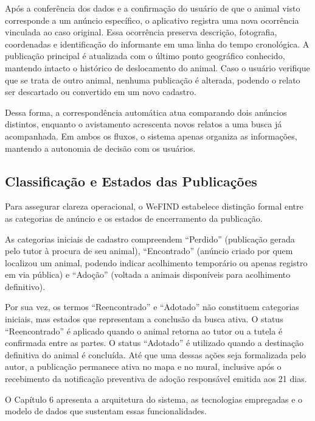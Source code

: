 Após a conferência dos dados e a confirmação do usuário de que o animal visto corresponde a um anúncio específico, o aplicativo registra uma nova ocorrência vinculada ao caso original. Essa ocorrência preserva descrição, fotografia, coordenadas e identificação do informante em uma linha do tempo cronológica. A publicação principal é atualizada com o último ponto geográfico conhecido, mantendo intacto o histórico de deslocamento do animal. Caso o usuário verifique que se trata de outro animal, nenhuma publicação é alterada, podendo o relato ser descartado ou convertido em um novo cadastro.

Dessa forma, a correspondência automática atua comparando dois anúncios distintos, enquanto o avistamento acrescenta novos relatos a uma busca já acompanhada. Em ambos os fluxos, o sistema apenas organiza as informações, mantendo a autonomia de decisão com os usuários.


\subsection{Classificação e Estados das Publicações}

Para assegurar clareza operacional, o WeFIND estabelece distinção formal entre as categorias de anúncio e os estados de encerramento da publicação.

As categorias iniciais de cadastro compreendem ``Perdido'' (publicação gerada pelo tutor à procura de seu animal), ``Encontrado'' (anúncio criado por quem localizou um animal, podendo indicar acolhimento temporário ou apenas registro em via pública) e ``Adoção'' (voltada a animais disponíveis para acolhimento definitivo).

Por sua vez, os termos ``Reencontrado'' e ``Adotado'' não constituem categorias iniciais, mas estados que representam a conclusão da busca ativa. O status ``Reencontrado'' é aplicado quando o animal retorna ao tutor ou a tutela é confirmada entre as partes. O status ``Adotado'' é utilizado quando a destinação definitiva do animal é concluída. Até que uma dessas ações seja formalizada pelo autor, a publicação permanece ativa no mapa e no mural, inclusive após o recebimento da notificação preventiva de adoção responsável emitida aos 21 dias.

O Capítulo 6 apresenta a arquitetura do sistema, as tecnologias empregadas e o modelo de dados que sustentam essas funcionalidades.
